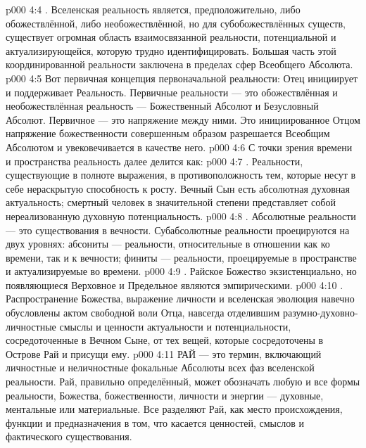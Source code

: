 \vs p000 4:4 . Вселенская реальность является, предположительно, либо обожествлённой, либо необожествлённой, но для субобожествлённых существ, существует огромная область взаимосвязанной реальности, потенциальной и актуализирующейся, которую трудно идентифицировать. Большая часть этой координированной реальности заключена в пределах сфер Всеобщего Абсолюта.
\vs p000 4:5 Вот первичная концепция первоначальной реальности: Отец инициирует и поддерживает Реальность. Первичные  реальности --- это обожествлённая и необожествлённая реальность --- Божественный Абсолют и Безусловный Абсолют. Первичное  --- это напряжение между ними. Это инициированное Отцом напряжение божественности совершенным образом разрешается Всеобщим Абсолютом и увековечивается в качестве него.
\vs p000 4:6 \pc С точки зрения времени и пространства реальность далее делится как:
\vs p000 4:7 . Реальности, существующие в полноте выражения, в противоположность тем, которые несут в себе нераскрытую способность к росту. Вечный Сын есть абсолютная духовная актуальность; смертный человек в значительной степени представляет собой нереализованную духовную потенциальность.
\vs p000 4:8 . Абсолютные реальности --- это существования в вечности. Субабсолютные реальности проецируются на двух уровнях: абсониты --- реальности, относительные в отношении как ко времени, так и к вечности; финиты --- реальности, проецируемые в пространстве и актуализируемые во времени.
\vs p000 4:9 . Райское Божество экзистенциально, но появляющиеся Верховное и Предельное являются эмпирическими.
\vs p000 4:10 . Распространение Божества, выражение личности и вселенская эволюция навечно обусловлены актом свободной воли Отца, навсегда отделившим разумно\hyp{}духовно\hyp{}личностные смыслы и ценности актуальности и потенциальности, сосредоточенные в Вечном Сыне, от тех вещей, которые сосредоточены в Острове Рай и присущи ему.
\vs p000 4:11 \pc РАЙ --- это термин, включающий личностные и неличностные фокальные Абсолюты всех фаз вселенской реальности. Рай, правильно определённый, может обозначать любую и все формы реальности, Божества, божественности, личности и энергии --- духовные, ментальные или материальные. Все разделяют Рай, как место происхождения, функции и предназначения в том, что касается ценностей, смыслов и фактического существования.
